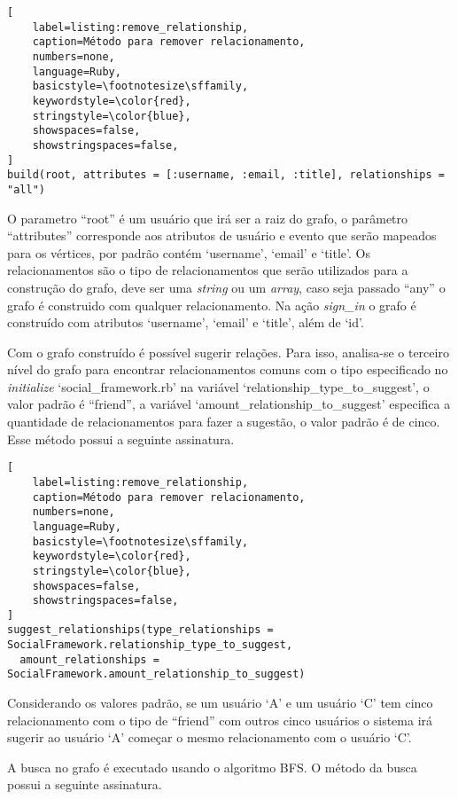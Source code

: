 \begin{lstlisting}[
    label=listing:remove_relationship,
    caption=Método para remover relacionamento,
    numbers=none,
    language=Ruby,
    basicstyle=\footnotesize\sffamily,
    keywordstyle=\color{red},
    stringstyle=\color{blue},
    showspaces=false,
    showstringspaces=false,
]
build(root, attributes = [:username, :email, :title], relationships = "all")
\end{lstlisting}

O parametro ``root'' é um usuário que irá ser a raiz do grafo, o parâmetro ``attributes'' corresponde aos atributos de usuário e evento que serão mapeados para os vértices, por padrão contém `username', `email' e `title'. Os relacionamentos são o tipo de relacionamentos que serão utilizados para a construção do grafo, deve ser uma \textit{string} ou um \textit{array}, caso seja passado ``any'' o grafo é construido com qualquer relacionamento. Na ação \textit{sign\_in} o grafo é construído com atributos `username', `email' e `title', além de `id'.

Com o grafo construído é possível sugerir relações. Para isso, analisa-se o terceiro nível do grafo para encontrar relacionamentos comuns com o tipo especificado no \textit{initialize} `social\_framework.rb' na variável `relationship\_type\_to\_suggest', o valor padrão é ``friend'', a variável `amount\_relationship\_to\_suggest' especifica a quantidade de relacionamentos para fazer a sugestão, o valor padrão é de cinco. Esse método possui a seguinte assinatura.

\begin{lstlisting}[
    label=listing:remove_relationship,
    caption=Método para remover relacionamento,
    numbers=none,
    language=Ruby,
    basicstyle=\footnotesize\sffamily,
    keywordstyle=\color{red},
    stringstyle=\color{blue},
    showspaces=false,
    showstringspaces=false,
]
suggest_relationships(type_relationships = SocialFramework.relationship_type_to_suggest,
  amount_relationships = SocialFramework.amount_relationship_to_suggest)
\end{lstlisting}

Considerando os valores padrão, se um usuário `A' e um usuário `C' tem cinco relacionamento com o tipo de ``friend'' com outros cinco usuários o sistema irá sugerir ao usuário `A' começar o mesmo relacionamento com o usuário `C'.

A busca no grafo é executado usando o algoritmo BFS. O método da busca possui a seguinte assinatura.

